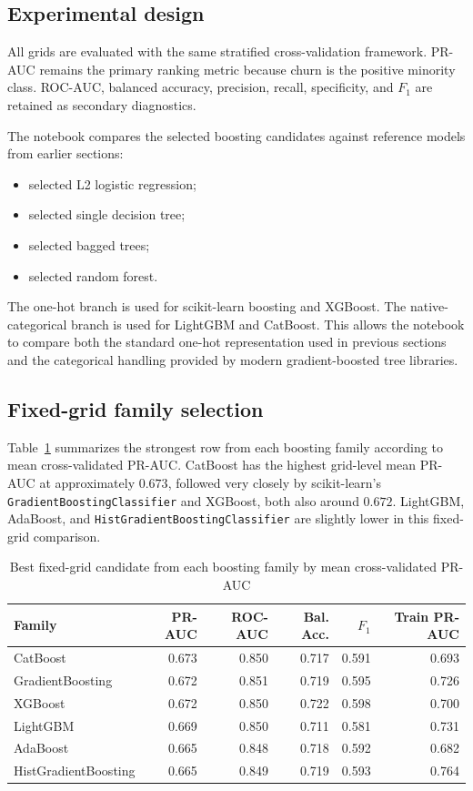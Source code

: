 \subsection{Experimental design}

All grids are evaluated with the same stratified cross-validation framework. PR-AUC remains the primary ranking metric because churn is the positive minority class. ROC-AUC, balanced accuracy, precision, recall, specificity, and \(F_1\) are retained as secondary diagnostics.

The notebook compares the selected boosting candidates against reference models from earlier sections:

\begin{itemize}[leftmargin=*]
    \item selected L2 logistic regression;
    \item selected single decision tree;
    \item selected bagged trees;
    \item selected random forest.
\end{itemize}

The one-hot branch is used for scikit-learn boosting and XGBoost. The native-categorical branch is used for LightGBM and CatBoost. This allows the notebook to compare both the standard one-hot representation used in previous sections and the categorical handling provided by modern gradient-boosted tree libraries.

\subsection{Fixed-grid family selection}

Table~\ref{tab:boosting-selection-summary} summarizes the strongest row from each boosting family according to mean cross-validated PR-AUC. CatBoost has the highest grid-level mean PR-AUC at approximately \(0.673\), followed very closely by scikit-learn's \texttt{GradientBoostingClassifier} and XGBoost, both also around \(0.672\). LightGBM, AdaBoost, and \texttt{HistGradientBoostingClassifier} are slightly lower in this fixed-grid comparison.

\begin{table}[H]
\centering
\small
\begin{tabular}{lrrrrr}
\toprule
Family & PR-AUC & ROC-AUC & Bal. Acc. & \(F_1\) & Train PR-AUC \\
\midrule
CatBoost & 0.673 & 0.850 & 0.717 & 0.591 & 0.693 \\
GradientBoosting & 0.672 & 0.851 & 0.719 & 0.595 & 0.726 \\
XGBoost & 0.672 & 0.850 & 0.722 & 0.598 & 0.700 \\
LightGBM & 0.669 & 0.850 & 0.711 & 0.581 & 0.731 \\
AdaBoost & 0.665 & 0.848 & 0.718 & 0.592 & 0.682 \\
HistGradientBoosting & 0.665 & 0.849 & 0.719 & 0.593 & 0.764 \\
\bottomrule
\end{tabular}
\caption{Best fixed-grid candidate from each boosting family by mean cross-validated PR-AUC}
\label{tab:boosting-selection-summary}
\end{table}

